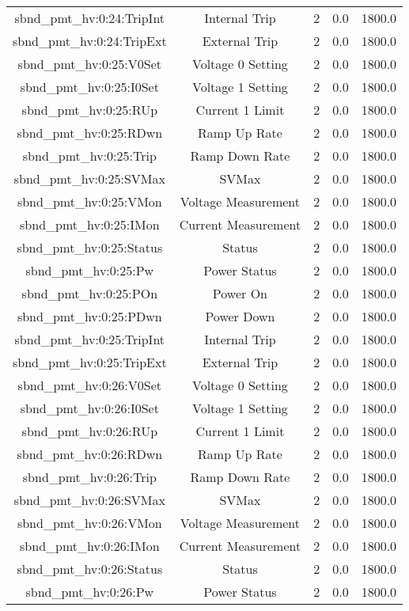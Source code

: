 \begin{center}
\begin{longtable}{c | c c c c }
sbnd\_pmt\_hv:0:24:TripInt & Internal Trip & 2 & 0.0 & 1800.0\\ 
sbnd\_pmt\_hv:0:24:TripExt & External Trip & 2 & 0.0 & 1800.0\\ 
sbnd\_pmt\_hv:0:25:V0Set & Voltage 0 Setting & 2 & 0.0 & 1800.0\\ 
sbnd\_pmt\_hv:0:25:I0Set & Voltage 1 Setting & 2 & 0.0 & 1800.0\\ 
sbnd\_pmt\_hv:0:25:RUp & Current 1 Limit & 2 & 0.0 & 1800.0\\ 
sbnd\_pmt\_hv:0:25:RDwn & Ramp Up Rate & 2 & 0.0 & 1800.0\\ 
sbnd\_pmt\_hv:0:25:Trip & Ramp Down Rate & 2 & 0.0 & 1800.0\\ 
sbnd\_pmt\_hv:0:25:SVMax & SVMax & 2 & 0.0 & 1800.0\\ 
sbnd\_pmt\_hv:0:25:VMon & Voltage Measurement & 2 & 0.0 & 1800.0\\ 
sbnd\_pmt\_hv:0:25:IMon & Current Measurement & 2 & 0.0 & 1800.0\\ 
sbnd\_pmt\_hv:0:25:Status & Status & 2 & 0.0 & 1800.0\\ 
sbnd\_pmt\_hv:0:25:Pw & Power Status & 2 & 0.0 & 1800.0\\ 
sbnd\_pmt\_hv:0:25:POn & Power On & 2 & 0.0 & 1800.0\\ 
sbnd\_pmt\_hv:0:25:PDwn & Power Down & 2 & 0.0 & 1800.0\\ 
sbnd\_pmt\_hv:0:25:TripInt & Internal Trip & 2 & 0.0 & 1800.0\\ 
sbnd\_pmt\_hv:0:25:TripExt & External Trip & 2 & 0.0 & 1800.0\\ 
sbnd\_pmt\_hv:0:26:V0Set & Voltage 0 Setting & 2 & 0.0 & 1800.0\\ 
sbnd\_pmt\_hv:0:26:I0Set & Voltage 1 Setting & 2 & 0.0 & 1800.0\\ 
sbnd\_pmt\_hv:0:26:RUp & Current 1 Limit & 2 & 0.0 & 1800.0\\ 
sbnd\_pmt\_hv:0:26:RDwn & Ramp Up Rate & 2 & 0.0 & 1800.0\\ 
sbnd\_pmt\_hv:0:26:Trip & Ramp Down Rate & 2 & 0.0 & 1800.0\\ 
sbnd\_pmt\_hv:0:26:SVMax & SVMax & 2 & 0.0 & 1800.0\\ 
sbnd\_pmt\_hv:0:26:VMon & Voltage Measurement & 2 & 0.0 & 1800.0\\ 
sbnd\_pmt\_hv:0:26:IMon & Current Measurement & 2 & 0.0 & 1800.0\\ 
sbnd\_pmt\_hv:0:26:Status & Status & 2 & 0.0 & 1800.0\\ 
sbnd\_pmt\_hv:0:26:Pw & Power Status & 2 & 0.0 & 1800.0\\ 

\end{longtable}
\end{center}
